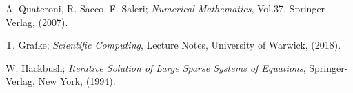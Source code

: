 \documentclass[11pt]{article}
\theoremstyle{theorem}
\theoremstyle{definition}
\begin{document}
\cleardoublepage
\begin{thebibliography}{99}

 A. Quateroni, R. Sacco, F. Saleri;
\emph{Numerical Mathematics}, Vol.37, Springer Verlag, (2007).

 T. Grafke;
\emph{Scientific Computing}, Lecture Notes, University of Warwick, (2018).

 W. Hackbush; 
\emph{Iterative Solution of Large Sparse Systems of Equations}, Springer-Verlag, New York, (1994).







\printindex
\end{thebibliography}
\end{document}
